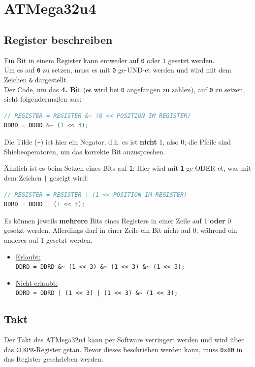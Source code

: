 \chapter{ATMega32u4}

\section{Register beschreiben}
Ein Bit in einem Register kann entweder auf \verb|0| oder \verb|1| gesetzt werden. \\
Um es auf \verb|0| zu setzen, muss es mit \verb|0| ge-UND-et werden und wird mit dem Zeichen \verb|&| dargestellt. \\

Der Code, um das \textbf{4. Bit} (es wird bei \verb|0| angefangen zu zählen), auf \verb|0| zu setzen, sieht folgendermaßen aus:
\begin{lstlisting}[language=C]
// REGISTER = REGISTER &~ (0 << POSITION IM REGISTER)
DDRD = DDRD &~ (1 << 3);
\end{lstlisting}
Die Tilde (\verb|~|) ist hier ein Negator, d.h. es ist \textbf{nicht} 1, also 0; die Pfeile sind Shiebeoperatoren, um das korrekte Bit anzusprechen.
\vspace{0.5cm}

Ähnlich ist es beim Setzen eines Bits auf \verb|1|: Hier wird mit \verb|1| ge-ODER-et, was mit dem Zeichen \verb$|$ gezeigt wird:
\begin{lstlisting}[language=C]
// REGISTER = REGISTER | (1 << POSITION IM REGISTER)
DDRD = DDRD | (1 << 3);
\end{lstlisting}

\vspace{0.5cm}

Es können jeweils \textbf{mehrere} Bits eines Registers in einer Zeile auf 1 \textbf{oder} 0 gesetzt werden. Allerdings darf in einer Zeile ein Bit nicht auf 0, während ein anderes auf 1 gesetzt werden.

\begin{itemize}
    \item \underline{Erlaubt:} \\
    \verb|DDRD = DDRD &~ (1 << 3) &~ (1 << 3) &~ (1 << 3);|
    \item \underline{Nicht erlaubt:} \\
    \verb$DDRD = DDRD | (1 << 3) | (1 << 3) &~ (1 << 3);$
\end{itemize}

\newpage

\section{Takt}
Der Takt des ATMega32u4 kann per Software verringert werden und wird über das \verb|CLKPR|-Register getan. Bevor dieses beschrieben werden kann, muss \verb|0x80| in das Register geschrieben werden.

